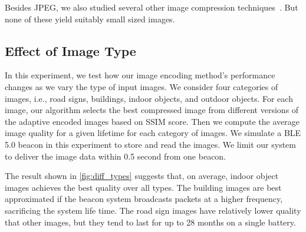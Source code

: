 Besides JPEG, we also studied several other image compression techniques~\cite{mohamed1995binary}\cite{zahir2007new}\cite{zahir2005new}. But none of these yield suitably small sized images.



\subsection{Effect of Image Type}

In this experiment, we test how our image encoding method's performance changes as we vary the type of input images. We consider four categories of images, i.e., road signs, buildings, indoor objects, and outdoor objects. For each image, our algorithm selects the best compressed image from different versions of the adaptive encoded images based on SSIM score. Then we compute the average image quality for a given lifetime for each category of images. We simulate a BLE 5.0 beacon in this experiment to store and read the images. We limit our system to deliver the image data within 0.5 second from one beacon.

The result shown in \ref{fig:diff_types} suggests that, on average, indoor object images achieves the best quality over all types. The building images are best approximated if the beacon system broadcasts packets at a higher frequency, sacrificing the system life time. The road sign images have relatively lower quality that other images, but they tend to last for up to 28 months on a single battery.


